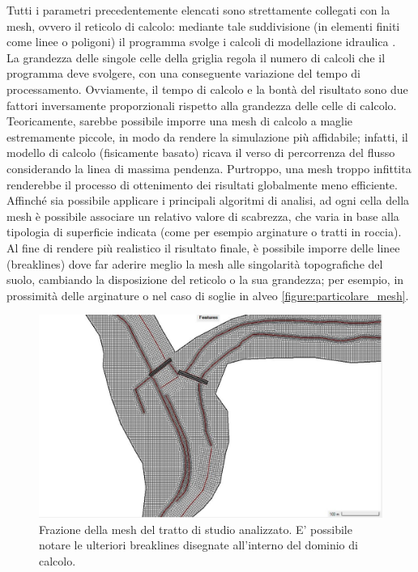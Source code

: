 Tutti i parametri precedentemente elencati sono strettamente collegati con la mesh, ovvero il reticolo di calcolo: mediante tale suddivisione (in elementi finiti come linee o poligoni) il programma svolge i calcoli di modellazione idraulica \cite{grid_and_dual_grid}.\\
La grandezza delle singole celle della griglia regola il numero di calcoli che il programma deve svolgere, con una conseguente variazione del tempo di processamento. Ovviamente, il tempo di calcolo e la bontà del risultato sono due fattori inversamente proporzionali rispetto alla grandezza delle celle di calcolo.\\
Teoricamente, sarebbe possibile imporre una mesh di calcolo a maglie estremamente piccole, in modo da rendere la simulazione più affidabile; infatti, il modello di calcolo (fisicamente basato) ricava il verso di percorrenza del flusso considerando la linea di massima pendenza. Purtroppo, una mesh troppo infittita renderebbe il processo di ottenimento dei risultati globalmente meno efficiente.\\
Affinché sia possibile applicare i principali algoritmi di analisi, ad ogni cella della mesh è possibile associare un relativo valore di scabrezza, che varia in base alla tipologia di superficie indicata (come per esempio arginature o tratti in roccia).\\
Al fine di rendere più realistico il risultato finale, è possibile imporre delle linee (breaklines) dove far aderire meglio la mesh alle singolarità topografiche del suolo, cambiando la disposizione del reticolo o la sua grandezza; per esempio, in prossimità delle arginature o nel caso di soglie in alveo \eqref{figure:particolare_mesh}.

\begin{figure}[H] \centering
    \includegraphics[scale=0.3]{immagini/particolare_mesh.JPG}
    \caption{Frazione della mesh del tratto di studio analizzato. E' possibile notare le ulteriori breaklines disegnate all'interno del dominio di calcolo.}
    \label{figure:particolare_mesh}
\end{figure}

